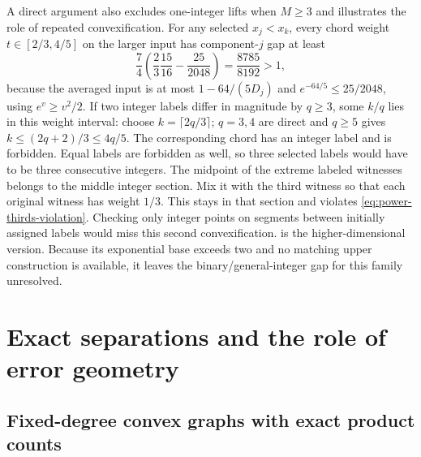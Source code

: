 A direct argument also excludes one-integer lifts when $M\ge3$ and
illustrates the role of repeated convexification.
For any selected $x_j<x_k$, every chord
weight $t\in[2/3,4/5]$ on the larger input has component-$j$ gap at least
\[
 \frac74\left(\frac23\frac{15}{16}-\frac{25}{2048}\right)
 =\frac{8785}{8192}>1,
\]
because the averaged input is at most $1-64/(5D_j)$ and
$e^{-64/5}\le25/2048$, using $e^v\ge v^2/2$.
If two integer labels differ in magnitude by $q\ge3$, some $k/q$
lies in this weight interval: choose $k=\lceil2q/3\rceil$;
$q=3,4$ are direct and $q\ge5$ gives
$k\le(2q+2)/3\le4q/5$. The corresponding chord has an integer
label and is forbidden. Equal labels are forbidden as well, so three
selected labels would have to be three consecutive integers. The midpoint
of the extreme labeled witnesses belongs to the middle integer section.
Mix it with the third witness so that each original witness has weight
$1/3$. This stays in that section and violates
\eqref{eq:power-thirds-violation}. Checking only integer points on
segments between initially assigned labels would miss this second
convexification.  is the higher-dimensional version.
Because its exponential base exceeds two and no matching upper
construction is available, it leaves the binary/general-integer gap for
this family unresolved.

\section{Exact separations and the role of error geometry}
\label{sec:exact-separations}

\subsection{Fixed-degree convex graphs with exact product counts}

